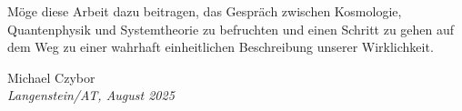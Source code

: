 \documentclass[11pt, a5paper, twoside, openright]{book}
\begin{document}
Möge diese Arbeit dazu beitragen, das Gespräch zwischen Kosmologie, Quantenphysik und Systemtheorie zu befruchten und einen Schritt zu gehen auf dem Weg zu einer wahrhaft
einheitlichen Beschreibung unserer Wirklichkeit.

\begin{flushright}
    Michael Czybor \\
    \emph{Langenstein/AT, August 2025}
\end{flushright}

\tableofcontents
\listoffigures
\listoftables

\mainmatter



\appendix


\backmatter
\printbibliography[title=Literaturverzeichnis]
\glswritefiles
\printglossary[title=Glossar]
\printglossary[type=acronym, title=Abkürzungen]
\end{document}
